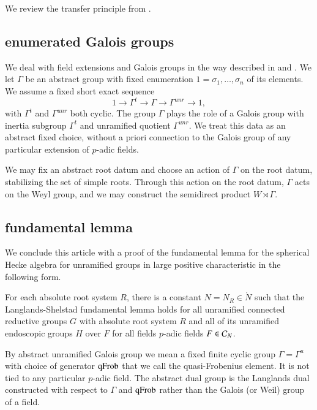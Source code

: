 We review the transfer principle from
\cite{cluckers2010constructible}.

\subsection{enumerated Galois groups}

We deal with field extensions and Galois groups in the way described
in \cite{gordon} and \cite{cluckers2011transfer}.  We let $\Gamma$ be
an abstract group with fixed enumeration $1=\sigma_1,\ldots,\sigma_n$
of its elements.  We assume a fixed short exact sequence
\[
1\to \Gamma^t\to\Gamma\to\Gamma^{unr}\to 1,
\]
with $\Gamma^t$ and $\Gamma^{unr}$ both cyclic.  The group $\Gamma$
plays the role of a Galois group with inertia subgroup $\Gamma^t$ and
unramified quotient $\Gamma^{unr}$.  We treat this data as an abstract
fixed choice, without a priori connection to the Galois group of any
particular extension of $p$-adic fields.

We may fix an abstract root datum and choose an action of $\Gamma$ on
the root datum, stabilizing the set of simple roots.  Through this
action on the root datum, $\Gamma$ acts on the Weyl group, and we may
construct the semidirect product $W\rtimes \Gamma$.


\subsection{fundamental lemma}

We conclude this article with a proof of the fundamental lemma for the
spherical Hecke algebra for unramified groups in large positive
characteristic in the following form.

\begin{theorem} \label{thm:fl} For each absolute root system $R$,
  there is a constant $N=N_R\in\ring{N}$ such that the
  Langlands-Shelstad fundamental lemma holds for all unramified
  connected reductive groups $G$ with absolute root system $R$ and all
  of its unramified endoscopic groups $H$ over $F$ for all fields
  $p$-adic fields $F\in \mathcal C_N$.
\end{theorem}

By abstract unramified Galois group we mean a fixed finite cyclic
group $\Gamma=\Gamma^u$ with choice of generator ${\operatorname{qFrob}}$ that we
call the quasi-Frobenius element.  It is not tied to any particular
$p$-adic field.  The abstract dual group is the Langlands dual
constructed with respect to $\Gamma$ and ${\operatorname{qFrob}}$ rather than the
Galois (or Weil) group of a field.


